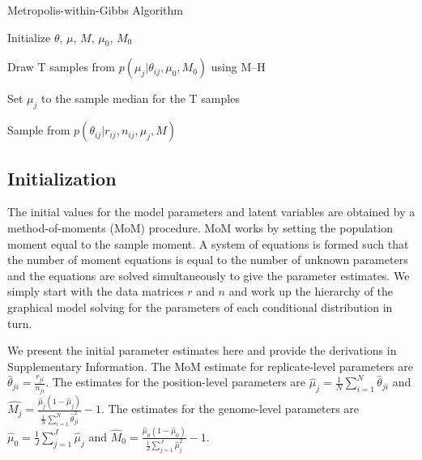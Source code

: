 \documentclass{bioinfo}
\begin{document}
\begin{algorithm}[ht]
  \caption{Metropolis-within-Gibbs Algorithm}
  \label{alg:metro_gibbs}
  \begin{algorithmic}[1]

  \State Initialize $\theta$, $\mu$, $M$, $\mu_0$, $M_0$

  \Repeat


    \State Draw T samples from $p \left( \mu_j |\theta_{ij},\mu_0,M_0\right)$ using M--H 

    \State Set $\mu_j$ to the sample median for the T samples


	\State Sample from $p \left( \theta_{ij} |r_{ij},n_{ij},\mu_j,M \right)$
	
      \EndFor

    \EndFor


  \end{algorithmic}
\end{algorithm}


\subsection{Initialization}
The initial values for the model parameters and latent variables are obtained by a method-of-moments (MoM) procedure. MoM works by setting the population moment equal to the sample moment. A system of equations is formed such that the number of moment equations is equal to the number of unknown parameters and the equations are solved simultaneously to give the parameter estimates. We simply start with the data matrices $r$ and $n$ and work up the hierarchy of the graphical model solving for the parameters of each conditional distribution in turn.

We present the initial parameter estimates here and provide the derivations in Supplementary Information. The MoM estimate for replicate-level parameters are
$\hat{\theta}_{ji} = \frac{r_{ji}} {n_{ji}}$.
The estimates for the position-level parameters are
$\hat{\mu}_j = \frac{1}{N} \sum_{i=1}^N \hat{\theta}_{ji}$
and
$\hat{M_j} = \frac{ \hat{\mu}_j (1 - \hat{\mu}_j ) } { \frac{1}{N} \sum_{i=1}^N \hat{\theta}_{ji}^2 } -1$.
The estimates for the genome-level parameters are
$\hat{\mu}_0 = \frac{1}{J} \sum_{j=1}^J \hat{\mu}_j$
and
$\hat{M}_0 = \frac{ \hat{\mu}_0 (1 - \hat{\mu}_0 ) } {\frac{1}{J} \sum_{j=1}^J \hat{\mu}_j^2 } -1$.
\end{document}
